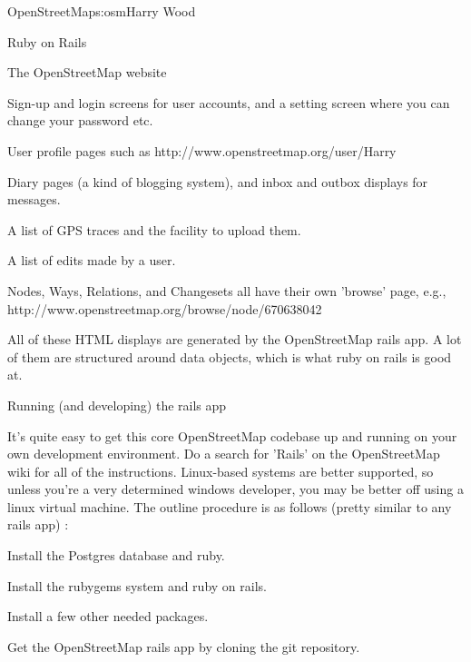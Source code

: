 \begin{aosachapter}{OpenStreetMap}{s:osm}{Harry Wood}
\begin{aosasect1}{Ruby on Rails}
\begin{aosasect2}{The OpenStreetMap website}
\begin{aosaitemize}

\item Sign-up and login screens for user accounts, and a setting
  screen where you can change your password etc.

\item User profile pages such as http://www.openstreetmap.org/user/Harry%

\item Diary pages (a kind of blogging system), and inbox and outbox
  displays for messages.

\item A list of GPS traces and the facility to upload them.

\item A list of edits made by a user.

\item Nodes, Ways, Relations, and Changesets all have their own
  'browse' page, e.g.,
  http://www.openstreetmap.org/browse/node/670638042

\end{aosaitemize}

All of these HTML displays are generated by the OpenStreetMap rails
app. A lot of them are structured around data objects, which is what
ruby on rails is good at.

\end{aosasect2}

\begin{aosasect2}{Running (and developing) the rails app}

It's quite easy to get this core OpenStreetMap codebase up and running
on your own development environment. Do a search for 'Rails' on the
OpenStreetMap wiki for all of the instructions. Linux-based systems
are better supported, so unless you're a very determined windows
developer, you may be better off using a linux virtual machine. The
outline procedure is as follows (pretty similar to any rails app) :

\begin{aosaitemize}

\item Install the Postgres database and ruby.

\item Install the rubygems system and ruby on rails.

\item Install a few other needed packages.

\item Get the OpenStreetMap rails app by cloning the git repository.


\end{aosaitemize}
\end{aosasect2}
\end{aosasect1}
\end{aosachapter}
